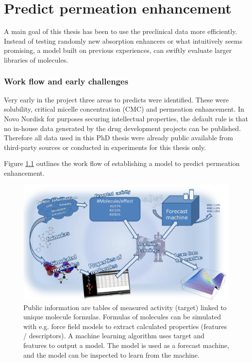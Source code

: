 \chapter{Predict permeation enhancement}

A main goal of this thesis has been to use the preclinical data more efficiently. Instead of testing randomly new absorption enhancers or what intuitively seems promising, a model built on previous experiences, can swiftly evaluate larger libraries of molecules.

\subsection{Work flow and early challenges}
\label{predPerm:workflow}

Very early in the project three areas to predicts were identified. These were solubility, critical micelle concentration (CMC) and permeation enhancement. In Novo Nordisk for purposes securing intellectual properties, the default rule is that no in-house data generated by the drug development projects can be published. Therefore all data used in this PhD thesis were already public available from third-party sources or conducted in experiments for this thesis only.

Figure \ref{predict_workflow} outlines the work flow of establishing a model to predict permeation enhancement.

\begin{figure}[!htbp]

\includegraphics[width=\textwidth, height=\textheight, keepaspectratio]{graphics/predictPotencySummary.pdf}
\caption{Public information are tables of measured activity (target) linked to unique molecule formulas. Formulas of molecules can be simulated with e.g. force field models to extract calculated properties (features / descriptors). A machine learning algorithm uses target and features to output a model. The model is used as a forecast machine, and the model can be inspected to learn from the machine.}
\label{predict_workflow}
\end{figure}

